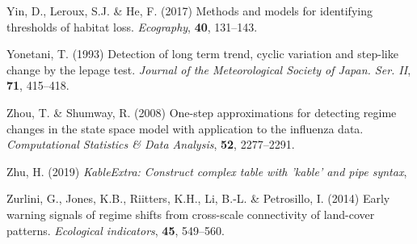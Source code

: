 \documentclass[print]{nuthesis}
\begin{document}
\leavevmode\hypertarget{ref-yin2017methods}{}%
Yin, D., Leroux, S.J. \& He, F. (2017) Methods and models for identifying thresholds of habitat loss. \emph{Ecography}, \textbf{40}, 131--143.

\leavevmode\hypertarget{ref-yonetani1993detection}{}%
Yonetani, T. (1993) Detection of long term trend, cyclic variation and step-like change by the lepage test. \emph{Journal of the Meteorological Society of Japan. Ser. II}, \textbf{71}, 415--418.

\leavevmode\hypertarget{ref-zhou2008one}{}%
Zhou, T. \& Shumway, R. (2008) One-step approximations for detecting regime changes in the state space model with application to the influenza data. \emph{Computational Statistics \& Data Analysis}, \textbf{52}, 2277--2291.

\leavevmode\hypertarget{ref-kableExtra}{}%
Zhu, H. (2019) \emph{KableExtra: Construct complex table with 'kable' and pipe syntax},

\leavevmode\hypertarget{ref-zurlini2014early}{}%
Zurlini, G., Jones, K.B., Riitters, K.H., Li, B.-L. \& Petrosillo, I. (2014) Early warning signals of regime shifts from cross-scale connectivity of land-cover patterns. \emph{Ecological indicators}, \textbf{45}, 549--560.



\backmatter

\appendix



\end{document}
